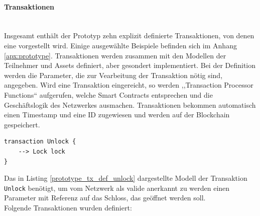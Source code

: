         \paragraph{\textrm{Transaktionen}}\hspace{0cm}\\
            Insgesamt enthält der Prototyp zehn explizit definierte Transaktionen, von denen eine vorgestellt wird. Einige ausgewählte Beispiele befinden sich im Anhang
            \ref{apx:prototype}.
            Transaktionen werden zusammen mit den Modellen der Teilnehmer und Assets definiert, aber gesondert implementiert. 
            Bei der Definition werden die Parameter, die zur Vearbeitung der Transaktion nötig sind, angegeben. 
            Wird eine Transaktion eingereicht, so werden ,,Transaction Processor Functions`` aufgerufen, welche Smart Contracts entsprechen und die Geschäftslogik des Netzwerkes ausmachen.
            Transaktionen bekommen automatisch einen Timestamp und eine ID zugewiesen und werden auf der Blockchain gespeichert. 
            \medskip
            \begin{lstlisting}[caption={Definition der \colorbox{light-gray}{\lstinline{Unlock}} Transaktion},label=prototype_tx_def_unlock,captionpos=b]
transaction Unlock {
    --> Lock lock
}
            \end{lstlisting}
            Das in Listing \ref{prototype_tx_def_unlock} dargestellte Modell der Transaktion \colorbox{light-gray}{\lstinline{Unlock}} benötigt, um vom Netzwerk als valide anerkannt zu werden einen Parameter mit Referenz auf das Schloss, das geöffnet werden soll.\\
            \medskip
            \indent Folgende Transaktionen wurden definiert:
